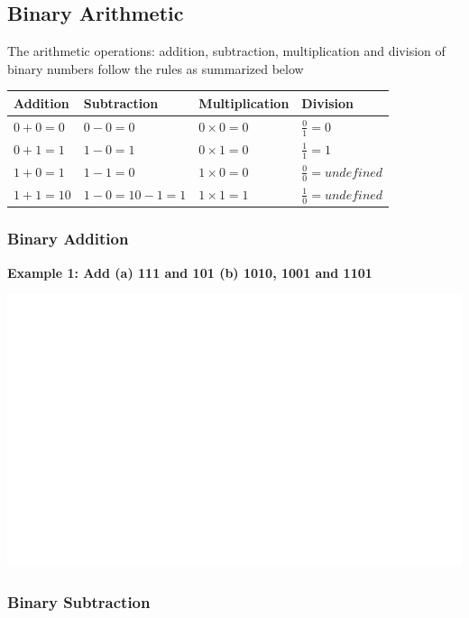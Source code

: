 \documentclass[]{book}
\begin{document}
\hypertarget{binary-arithmetic}{%
\subsection{Binary Arithmetic}\label{binary-arithmetic}}

The arithmetic operations: addition, subtraction, multiplication and division of binary numbers follow the rules as summarized below

\begin{longtable}[]{@{}llll@{}}
\toprule
Addition & Subtraction & Multiplication & Division\tabularnewline
\midrule
\endhead
\(0+0 = 0\) & \(0-0=0\) & \(0\times0=0\) & \(\frac{0}{1} = 0\)\tabularnewline
\(0+1 = 1\) & \(1-0=1\) & \(0\times1=0\) & \(\frac{1}{1} = 1\)\tabularnewline
\(1+0 = 1\) & \(1-1 = 0\) & \(1\times0=0\) & \(\frac{0}{0} = undefined\)\tabularnewline
\(1+1 = 10\) & \(1-0 = 10-1 =1\) & \(1\times1=1\) & \(\frac{1}{0} = undefined\)\tabularnewline
\bottomrule
\end{longtable}

\hypertarget{binary-addition}{%
\subsubsection{Binary Addition}\label{binary-addition}}

\textbf{Example 1: Add (a) 111 and 101 (b) 1010, 1001 and 1101}

\begin{center}\includegraphics[width=1\linewidth]{figure/NSbox22-1} \end{center}

\hypertarget{binary-subtraction}{%
\subsubsection{Binary Subtraction}\label{binary-subtraction}}
\end{document}
